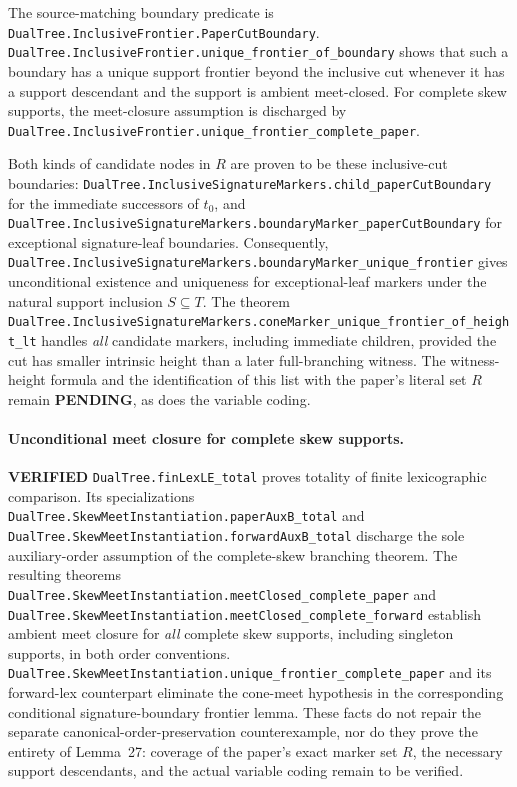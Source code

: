 \documentclass[11pt]{article}
\newcommand{\ok}{\textcolor{green!40!black}{\textbf{VERIFIED}}}
\newcommand{\todo}{\textcolor{gray!70!black}{\textbf{PENDING}}}
\newcommand{\lean}[1]{\texttt{#1}}
\begin{document}
The source-matching boundary predicate is
\lean{DualTree.InclusiveFrontier.PaperCutBoundary}.
\lean{DualTree.InclusiveFrontier.unique_frontier_of_boundary}
shows that such a boundary has a unique support frontier beyond the
inclusive cut whenever it has a support descendant and the support
is ambient meet-closed.  For complete skew supports, the meet-closure
assumption is discharged by
\lean{DualTree.InclusiveFrontier.unique_frontier_complete_paper}.

Both kinds of candidate nodes in $R$ are proven to be these inclusive-cut
boundaries:
\lean{DualTree.InclusiveSignatureMarkers.child_paperCutBoundary}
for the immediate successors of $t_0$, and
\lean{DualTree.InclusiveSignatureMarkers.boundaryMarker_paperCutBoundary}
for exceptional signature-leaf boundaries.  Consequently,
\lean{DualTree.InclusiveSignatureMarkers.boundaryMarker_unique_frontier}
gives unconditional existence and uniqueness for exceptional-leaf markers
under the natural support inclusion $S\subseteq T$.
The theorem
\lean{DualTree.InclusiveSignatureMarkers.coneMarker_unique_frontier_of_height_lt}
handles \emph{all} candidate markers, including immediate children,
provided the cut has smaller intrinsic height than a later full-branching
witness.  The witness-height formula and the identification of this list
with the paper's literal set $R$ remain \todo, as does the variable coding.



\paragraph{Unconditional meet closure for complete skew supports.} \ok
\lean{DualTree.finLexLE_total} proves totality of finite lexicographic
comparison.  Its specializations
\lean{DualTree.SkewMeetInstantiation.paperAuxB_total} and
\lean{DualTree.SkewMeetInstantiation.forwardAuxB_total}
discharge the sole auxiliary-order assumption of the complete-skew
branching theorem.  The resulting theorems
\lean{DualTree.SkewMeetInstantiation.meetClosed_complete_paper} and
\lean{DualTree.SkewMeetInstantiation.meetClosed_complete_forward}
establish ambient meet closure for \emph{all} complete skew supports,
including singleton supports, in both order conventions.
\lean{DualTree.SkewMeetInstantiation.unique_frontier_complete_paper}
and its forward-lex counterpart eliminate the cone-meet hypothesis in
the corresponding conditional signature-boundary frontier lemma.
These facts do not repair the separate canonical-order-preservation
counterexample, nor do they prove the entirety of Lemma~27:
coverage of the paper's exact marker set $R$, the necessary support
descendants, and the actual variable coding remain to be verified.
\end{document}
